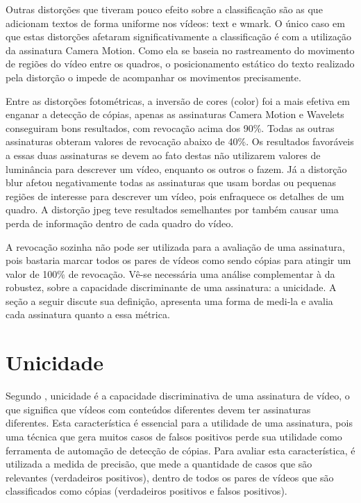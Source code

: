 Outras distorções que tiveram pouco efeito sobre a classificação são as que adicionam textos de forma uniforme nos vídeos: text e wmark. O único caso em que estas distorções afetaram significativamente a classificação é com a utilização da assinatura Camera Motion. Como ela se baseia no rastreamento do movimento de regiões do vídeo entre os quadros, o posicionamento estático do texto realizado pela distorção o impede de acompanhar os movimentos precisamente.

Entre as distorções fotométricas, a inversão de cores (color) foi a mais efetiva em enganar a detecção de cópias, apenas as assinaturas Camera Motion e Wavelets conseguiram bons resultados, com revocação acima dos 90\%. Todas as outras assinaturas obteram valores de revocação abaixo de 40\%. Os resultados favoráveis a essas duas assinaturas se devem ao fato destas não utilizarem valores de luminância para descrever um vídeo, enquanto os outros o fazem. Já a distorção blur afetou negativamente todas as assinaturas que usam bordas ou pequenas regiões de interesse para descrever um vídeo, pois enfraquece os detalhes de um quadro. A distorção jpeg teve resultados semelhantes por também causar uma perda de informação dentro de cada quadro do vídeo. 


A revocação sozinha não pode ser utilizada para a avaliação de uma assinatura, pois bastaria marcar todos os pares de vídeos como sendo cópias para atingir um valor de 100\% de revocação. Vê-se necessária uma análise complementar à da robustez, sobre a capacidade discriminante de uma assinatura: a unicidade. A seção a seguir discute sua definição, apresenta uma forma de medi-la e avalia cada assinatura quanto a essa métrica.

\section{Unicidade}

Segundo , unicidade é a capacidade discriminativa de uma assinatura de vídeo, o que significa que vídeos com conteúdos diferentes devem ter assinaturas diferentes. Esta característica é essencial para a utilidade de uma assinatura, pois uma técnica que gera muitos casos de falsos positivos perde sua utilidade como ferramenta de automação de detecção de cópias. Para avaliar esta característica, é utilizada a medida de precisão, que mede a quantidade de casos que são relevantes (verdadeiros positivos), dentro de todos os pares de vídeos que são classificados como cópias (verdadeiros positivos e falsos positivos)\cite{Ting2010}.

